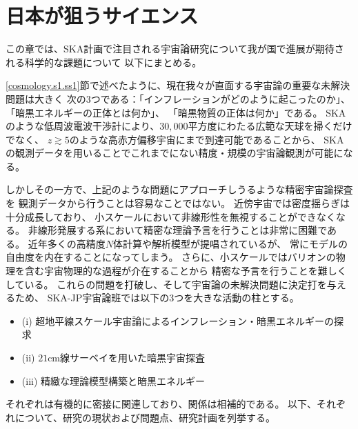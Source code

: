 \section{日本が狙うサイエンス}\label{cosmology.s3}

この章では、SKA計画で注目される宇宙論研究について我が国で進展が期待される科学的な課題について
以下にまとめる。

\ref{cosmology.s1.ss1}節で述べたように、現在我々が直面する宇宙論の重要な未解決問題は大きく
次の3つである：「インフレーションがどのように起こったのか」、「暗黒エネルギーの正体とは何か」、
「暗黒物質の正体は何か」である。
SKAのような低周波電波干渉計により、$30,000$平方度にわたる広範な天球を掃くだけでなく、
$z\gtrsim 5$のような高赤方偏移宇宙にまで到達可能であることから、
SKAの観測データを用いることでこれまでにない精度・規模の宇宙論観測が可能になる。

しかしその一方で、上記のような問題にアプローチしうるような精密宇宙論探査を
観測データから行うことは容易なことではない。
近傍宇宙では密度揺らぎは十分成長しており、
小スケールにおいて非線形性を無視することができなくなる。
非線形発展する系において精密な理論予言を行うことは非常に困難である。
近年多くの高精度$N$体計算や解析模型が提唱されているが、
常にモデルの自由度を内在することになってしまう。
さらに、小スケールではバリオンの物理を含む宇宙物理的な過程が介在することから
精密な予言を行うことを難しくしている。
これらの問題を打破し、そして宇宙論の未解決問題に決定打を与えるため、
SKA-JP宇宙論班では以下の3つを大きな活動の柱とする。
\begin{itemize}
\item[] (i) 超地平線スケール宇宙論によるインフレーション・暗黒エネルギーの探求
\item[] (ii) $21$cm線サーベイを用いた暗黒宇宙探査
\item[] (iii) 精緻な理論模型構築と暗黒エネルギー
\end{itemize}
それぞれは有機的に密接に関連しており、関係は相補的である。
以下、それぞれについて、研究の現状および問題点、研究計画を列挙する。\\

